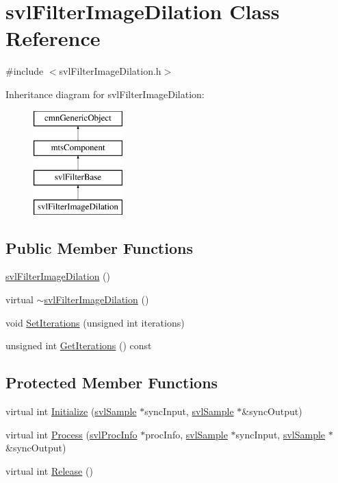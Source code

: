 \hypertarget{classsvl_filter_image_dilation}{\section{svl\-Filter\-Image\-Dilation Class Reference}
\label{classsvl_filter_image_dilation}
}


{\ttfamily \#include $<$svl\-Filter\-Image\-Dilation.\-h$>$}

Inheritance diagram for svl\-Filter\-Image\-Dilation\-:\begin{figure}[H]
\begin{center}
\leavevmode
\includegraphics[height=4.000000cm]{d3/d43/classsvl_filter_image_dilation}
\end{center}
\end{figure}
\subsection*{Public Member Functions}
\begin{DoxyCompactItemize}
\item 
\hyperlink{classsvl_filter_image_dilation_a34e1cf5925b81f9418624db014ed81bd}{svl\-Filter\-Image\-Dilation} ()
\item 
virtual \hyperlink{classsvl_filter_image_dilation_a7ebb1f17d844fe952bcc0f33119d0564}{$\sim$svl\-Filter\-Image\-Dilation} ()
\item 
void \hyperlink{classsvl_filter_image_dilation_a481098af2cfd506dbd903034c9ee2134}{Set\-Iterations} (unsigned int iterations)
\item 
unsigned int \hyperlink{classsvl_filter_image_dilation_aa931be14712581cd2d7bfa1c19cfc59f}{Get\-Iterations} () const 
\end{DoxyCompactItemize}
\subsection*{Protected Member Functions}
\begin{DoxyCompactItemize}
\item 
virtual int \hyperlink{classsvl_filter_image_dilation_ad7511de97eeedeefb89c8f59ce589c46}{Initialize} (\hyperlink{classsvl_sample}{svl\-Sample} $\ast$sync\-Input, \hyperlink{classsvl_sample}{svl\-Sample} $\ast$\&sync\-Output)
\item 
virtual int \hyperlink{classsvl_filter_image_dilation_a384dfb3791e42d43076ec90842e2a80a}{Process} (\hyperlink{structsvl_proc_info}{svl\-Proc\-Info} $\ast$proc\-Info, \hyperlink{classsvl_sample}{svl\-Sample} $\ast$sync\-Input, \hyperlink{classsvl_sample}{svl\-Sample} $\ast$\&sync\-Output)
\item 
virtual int \hyperlink{classsvl_filter_image_dilation_a020c8d14b164b276bdb782ae48196f8b}{Release} ()
\end{DoxyCompactItemize}
